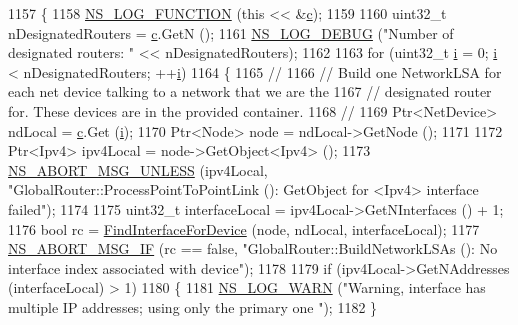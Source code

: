 \begin{DoxyCode}
1157 \{
1158   \hyperlink{log-macros-disabled_8h_a90b90d5bad1f39cb1b64923ea94c0761}{NS\_LOG\_FUNCTION} (\textcolor{keyword}{this} << &\hyperlink{lte_2model_2fading-traces_2fading__trace__generator_8m_ae0323a9039add2978bf5b49550572c7c}{c});
1159 
1160   uint32\_t nDesignatedRouters = \hyperlink{lte_2model_2fading-traces_2fading__trace__generator_8m_ae0323a9039add2978bf5b49550572c7c}{c}.GetN ();
1161   \hyperlink{group__logging_ga413f1886406d49f59a6a0a89b77b4d0a}{NS\_LOG\_DEBUG} (\textcolor{stringliteral}{"Number of designated routers: "} << nDesignatedRouters);
1162 
1163   \textcolor{keywordflow}{for} (uint32\_t \hyperlink{bernuolliDistribution_8m_a6f6ccfcf58b31cb6412107d9d5281426}{i} = 0; \hyperlink{bernuolliDistribution_8m_a6f6ccfcf58b31cb6412107d9d5281426}{i} < nDesignatedRouters; ++\hyperlink{bernuolliDistribution_8m_a6f6ccfcf58b31cb6412107d9d5281426}{i})
1164     \{
1165       \textcolor{comment}{//}
1166       \textcolor{comment}{// Build one NetworkLSA for each net device talking to a network that we are the }
1167       \textcolor{comment}{// designated router for.  These devices are in the provided container.}
1168       \textcolor{comment}{//}
1169       Ptr<NetDevice> ndLocal = \hyperlink{lte_2model_2fading-traces_2fading__trace__generator_8m_ae0323a9039add2978bf5b49550572c7c}{c}.Get (\hyperlink{bernuolliDistribution_8m_a6f6ccfcf58b31cb6412107d9d5281426}{i});
1170       Ptr<Node> node = ndLocal->GetNode ();
1171 
1172       Ptr<Ipv4> ipv4Local = node->GetObject<Ipv4> ();
1173       \hyperlink{group__fatal_ga0bd3f62c55e7347ff814572f3aaa3864}{NS\_ABORT\_MSG\_UNLESS} (ipv4Local, \textcolor{stringliteral}{"GlobalRouter::ProcessPointToPointLink ():
       GetObject for <Ipv4> interface failed"});
1174 
1175       uint32\_t interfaceLocal = ipv4Local->GetNInterfaces () + 1;
1176       \textcolor{keywordtype}{bool} rc = \hyperlink{classns3_1_1GlobalRouter_a7b30c3c09f93e3f3ac7cfe787b51d127}{FindInterfaceForDevice} (node, ndLocal, interfaceLocal);
1177       \hyperlink{group__fatal_ga6653324225bc139e46deea177614ceee}{NS\_ABORT\_MSG\_IF} (rc == \textcolor{keyword}{false}, \textcolor{stringliteral}{"GlobalRouter::BuildNetworkLSAs (): No interface index
       associated with device"});
1178 
1179       \textcolor{keywordflow}{if} (ipv4Local->GetNAddresses (interfaceLocal) > 1)
1180         \{
1181           \hyperlink{group__logging_gade7208b4009cdf0e25783cd26766f559}{NS\_LOG\_WARN} (\textcolor{stringliteral}{"Warning, interface has multiple IP addresses; using only the primary one
      "});
1182         \}

\end{DoxyCode}
